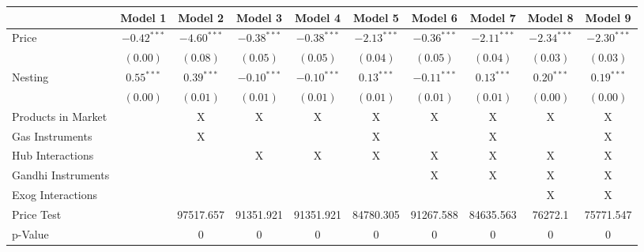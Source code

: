 
\begin{tabular}{l c c c c c c c c c}
\toprule
 & Model 1 & Model 2 & Model 3 & Model 4 & Model 5 & Model 6 & Model 7 & Model 8 & Model 9 \\
\midrule
Price                       & $-0.42^{***}$ & $-4.60^{***}$ & $-0.38^{***}$ & $-0.38^{***}$ & $-2.13^{***}$ & $-0.36^{***}$ & $-2.11^{***}$ & $-2.34^{***}$ & $-2.30^{***}$ \\
                            & $(0.00)$      & $(0.08)$      & $(0.05)$      & $(0.05)$      & $(0.04)$      & $(0.05)$      & $(0.04)$      & $(0.03)$      & $(0.03)$      \\
Nesting                     & $0.55^{***}$  & $0.39^{***}$  & $-0.10^{***}$ & $-0.10^{***}$ & $0.13^{***}$  & $-0.11^{***}$ & $0.13^{***}$  & $0.20^{***}$  & $0.19^{***}$  \\
                            & $(0.00)$      & $(0.01)$      & $(0.01)$      & $(0.01)$      & $(0.01)$      & $(0.01)$      & $(0.01)$      & $(0.00)$      & $(0.00)$      \\
\midrule
Products in Market          &               & X             & X             & X             & X             & X             & X             & X             & X             \\
Gas Instruments             &               & X             &               &               & X             &               & X             &               & X             \\
Hub Interactions            &               &               & X             & X             & X             & X             & X             & X             & X             \\
Gandhi Instruments          &               &               &               &               &               & X             & X             & X             & X             \\
Exog Interactions           &               &               &               &               &               &               &               & X             & X             \\
Price Test                  &               & 97517.657     & 91351.921     & 91351.921     & 84780.305     & 91267.588     & 84635.563     & 76272.1       & 75771.547     \\
p-Value                     &               & 0             & 0             & 0             & 0             & 0             & 0             & 0             & 0             \\

\end{tabular}
